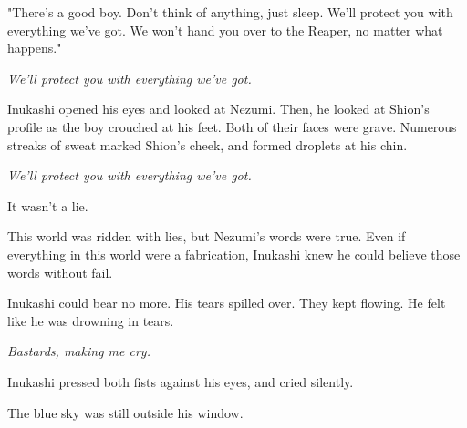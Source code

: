 "There's a good boy. Don't think of anything, just sleep. We'll protect
you with everything we've got. We won't hand you over to the Reaper, no
matter what happens."

\emph{We'll protect you with everything we've got.}

Inukashi opened his eyes and looked at Nezumi. Then, he looked at
Shion's profile as the boy crouched at his feet. Both of their faces
were grave. Numerous streaks of sweat marked Shion's cheek, and formed
droplets at his chin.

\emph{We'll protect you with everything we've got.}

It wasn't a lie.

This world was ridden with lies, but Nezumi's words were true. Even if
everything in this world were a fabrication, Inukashi knew he could
believe those words without fail.

Inukashi could bear no more. His tears spilled over. They kept flowing.
He felt like he was drowning in tears.

\emph{Bastards, making me cry.}

Inukashi pressed both fists against his eyes, and cried silently.

The blue sky was still outside his window.
